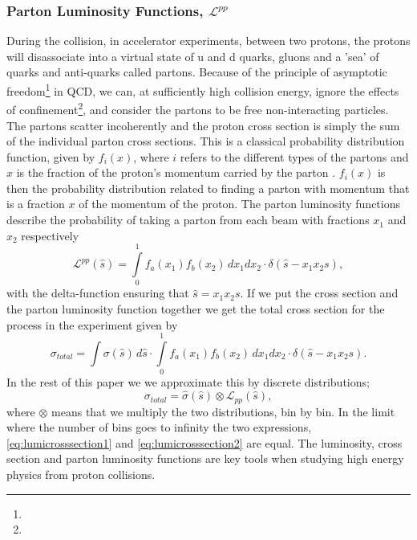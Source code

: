 \subsubsection{Parton Luminosity Functions, $\mathcal{L}^{pp}$}
During the collision, in accelerator experiments, between two protons, the protons will disassociate into a virtual state of u and d quarks, gluons and a 'sea' of quarks and anti-quarks called partons. Because of the principle of asymptotic freedom\footnote{} in QCD, we can, at sufficiently high collision energy, ignore the effects of confinement\footnote{}, and consider the partons to be free non-interacting particles. The partons scatter incoherently and the proton cross section is simply the sum of the individual parton cross sections. This is a classical probability distribution function, given by $f_{i}(x)$, where $i$ refers to the different types of the partons and $x$ is the fraction of the proton's momentum carried by the parton \cite{green2005hpp}. $f_{i}(x)$ is then the probability distribution related to finding a parton with momentum that is a fraction $x$ of the momentum of the proton. The parton luminosity functions describe the probability of taking a parton from each beam with fractions $x_{1}$ and $x_{2}$ respectively
\begin{equation}
\mathcal{L}^{pp}(\hat s)=\int\limits_{0}^{1} f_{a}(x_{1}) f_{b}(x_{2})\, dx_{1}dx_{2}\cdot \delta(\hat s - x_{1}x_{2}s),
\end{equation}
with the delta-function ensuring that $\hat s = x_{1}x_{2}s$. If we put the cross section and the parton luminosity function together we get the total cross section for the process in the experiment given by
\begin{equation} \label{eq:lumicrosssection1}
\sigma_{total}=\int \sigma(\hat s) \, d \hat s \cdot \int\limits_{0}^{1} f_{a}(x_{1}) f_{b}(x_{2})\, dx_{1}dx_{2} \cdot \delta(\hat s - x_{1}x_{2}s).
\end{equation}
In the rest of this paper we we approximate this by discrete distributions;
\begin{equation} \label{eq:lumicrosssection2}
\sigma_{total}= \hat \sigma(\hat s) \otimes  \mathcal{L}_{pp}(\hat s),
\end{equation}
where $\otimes$ means that we multiply the two distributions, bin by bin. In the limit where the number of bins goes to infinity the two expressions, \eqref{eq:lumicrosssection1} and \eqref{eq:lumicrosssection2} are equal. The luminosity, cross section and parton luminosity functions are key tools when studying high energy physics from proton collisions. %